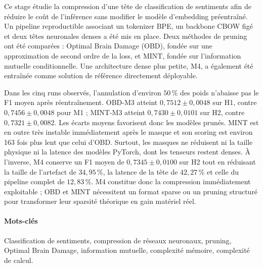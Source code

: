 
Ce stage étudie la compression d'une tête de classification de sentiments afin
de réduire le coût de l'inférence sans modifier le modèle d'embedding
préentraîné. Un pipeline reproductible associant un tokenizer BPE, un backbone
CBOW figé et deux têtes neuronales denses a été mis en place. Deux méthodes de
pruning ont été comparées : Optimal Brain Damage (OBD), fondée sur une
approximation de second ordre de la loss, et MINT, fondée sur l'information
mutuelle conditionnelle. Une architecture dense plus petite, M4, a également
été entraînée comme solution de référence directement déployable.

Dans les cinq runs observés, l'annulation d'environ $50\,\%$ des poids n'abaisse
pas le F1 moyen après réentraînement. OBD-M3 atteint
$0{,}7512\pm0{,}0048$ sur H1,
contre $0{,}7456\pm0{,}0048$ pour M1 ; MINT-M3 atteint
$0{,}7430\pm0{,}0101$ sur H2, contre $0{,}7321\pm0{,}0082$. Les écarts moyens
favorisent donc les modèles prunés.
MINT est en outre très instable immédiatement après le masque et son scoring
est environ 163 fois plus lent que celui d'OBD. Surtout, les masques ne réduisent
ni la taille physique ni la latence des modèles PyTorch, dont les tenseurs
restent denses. À l'inverse, M4 conserve un F1 moyen de
$0{,}7345\pm0{,}0100$ sur H2 tout en réduisant la taille de l'artefact de
$34{,}95\,\%$, la latence de la tête de $42{,}27\,\%$ et celle du pipeline
complet de $12{,}83\,\%$. M4 constitue donc la compression immédiatement
exploitable ; OBD et MINT nécessitent un format sparse ou un pruning structuré
pour transformer leur sparsité théorique en gain matériel réel.

\paragraph*{Mots-clés}

Classification de sentiments, compression de réseaux neuronaux, pruning,
Optimal Brain Damage, information mutuelle, complexité mémoire, complexité de
calcul.

